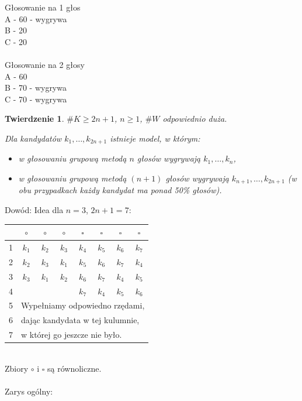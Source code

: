 \documentclass[12pt,a4paper]{article}
\theoremstyle{break}
\newtheorem{theorem}{Twierdzenie}[section]
\begin{document}
	Głosowanie na 1 głos\\
	A - 60 - wygrywa\\
	B - 20\\
	C - 20\\\\
	
	Głosowanie na 2 głosy\\
	A - 60\\
	B - 70 - wygrywa\\
	C - 70 - wygrywa
	
	
	\begin{theorem}
		$\# K \geq 2n+1$, $n \geq 1$, $\# W$ odpowiednio duża.
		
		Dla kandydatów $k_1, \dots, k_{2n+1}$ istnieje model, w którym:
		\begin{itemize}
			\item w głosowaniu grupową metodą $n$ głosów wygrywają $k_1, \dots, k_n$,
			\item w głosowaniu grupową metodą $(n+1)$ głosów wygrywają $k_{n+1}, \dots, k_{2n+1}$ (w obu przypadkach każdy kandydat ma ponad 50\% głosów).
		\end{itemize}
	\end{theorem}
	
	Dowód: Idea dla $n = 3$, $2n+1 = 7$:
	
	\begin{tabular}{|c|ccc|cccc|}\hline
		&$\circ$&$\circ$&$\circ$&$\square$&$\square$&$\square$&$\square$\\\hline
		1&$k_1$&$k_2$&$k_3$&$k_4$&$k_5$&$k_6$&$k_7$\\
		2&$k_2$&$k_3$&$k_1$&$k_5$&$k_6$&$k_7$&$k_4$\\
		3&$k_3$&$k_1$&$k_2$&$k_6$&$k_7$&$k_4$&$k_5$\\\hline
		4&&&&$k_7$&$k_4$&$k_5$&$k_6$\\\hline
		5&\multicolumn{7}{|l|}{Wypełniamy odpowiedno rzędami,}\\
		6&\multicolumn{7}{|l|}{dając kandydata w tej kulumnie,}\\
		7&\multicolumn{7}{|l|}{w której go jeszcze nie było.}\\\hline
	\end{tabular}\\

	Zbiory $\circ$ i $\square$ są równoliczne.\\\\
	
	Zarys ogólny:
	
\end{document}
